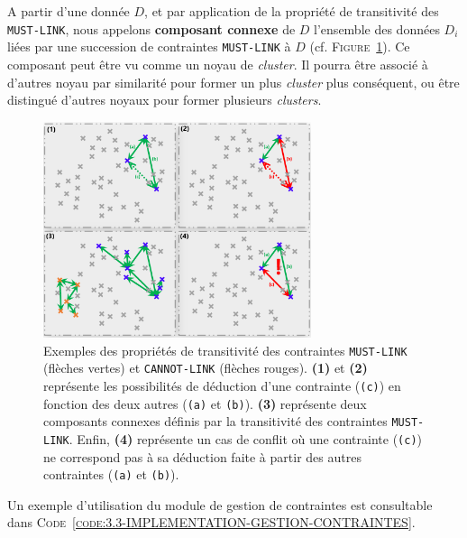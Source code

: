 		A partir d'une donnée \(D\), et par application de la propriété de transitivité des \texttt{MUST-LINK}, nous appelons \textbf{composant connexe} de \(D\) l'ensemble des données \(D_i\) liées par une succession de contraintes \texttt{MUST-LINK} à \(D\) (cf. \textsc{Figure~\ref{figure:3.3-CONTRAINTES-TRANSITIVITE}}).
		Ce composant peut être vu comme un noyau de \textit{cluster}. Il pourra être associé à d'autres noyau par similarité pour former un plus \textit{cluster} plus conséquent, ou être distingué d'autres noyaux pour former plusieurs \textit{clusters}.

		\begin{figure}[!htb]
			\centering
			\includegraphics[width=0.7\textwidth]{figures/example-constraints-transitivity}
			\caption{Exemples des propriétés de transitivité des contraintes \texttt{MUST-LINK} (flèches vertes) et \texttt{CANNOT-LINK} (flèches rouges). \textbf{(1)} et \textbf{(2)} représente les possibilités de déduction d'une contrainte (\texttt{(c)}) en fonction des deux autres (\texttt{(a)} et \texttt{(b)}). \textbf{(3)} représente deux composants connexes définis par la transitivité des contraintes \texttt{MUST-LINK}. Enfin, \textbf{(4)} représente un cas de conflit où une contrainte (\texttt{(c)}) ne correspond pas à sa déduction faite à partir des autres contraintes (\texttt{(a)} et \texttt{(b)}).}
			\label{figure:3.3-CONTRAINTES-TRANSITIVITE}
		\end{figure}
		
		Un exemple d'utilisation du module de gestion de contraintes est consultable dans \textsc{Code~\ref{code:3.3-IMPLEMENTATION-GESTION-CONTRAINTES}}.
		
